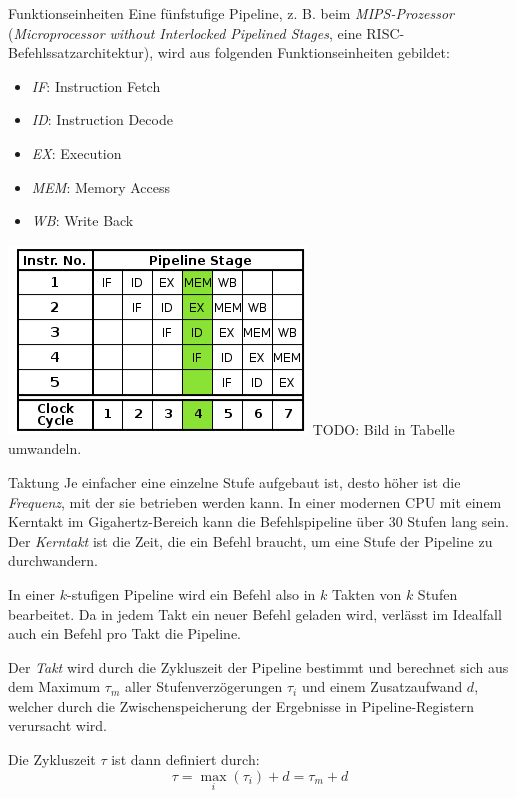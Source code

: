 \begin{defi}[Pipelining]{Funktionseinheiten}
    Eine fünfstufige Pipeline, z. B. beim \emph{MIPS-Prozessor} (\emph{Microprocessor without Interlocked Pipelined Stages}, eine RISC-Befehlssatzarchitektur), wird aus folgenden Funktionseinheiten gebildet:
    \begin{itemize}
        \item \emph{IF}: Instruction Fetch
        \item \emph{ID}: Instruction Decode
        \item \emph{EX}: Execution
        \item \emph{MEM}: Memory Access
        \item \emph{WB}: Write Back
    \end{itemize}
    
    \centering
    \includegraphics[width=0.5\linewidth]{images/5_stage_pipeline.png}
    TODO: Bild in Tabelle umwandeln.
\end{defi}

\begin{defi}[Pipelining]{Taktung}
    Je einfacher eine einzelne Stufe aufgebaut ist, desto höher ist die \emph{Frequenz}, mit der sie betrieben werden kann.
    In einer modernen CPU mit einem Kerntakt im Gigahertz-Bereich kann die Befehlspipeline über 30 Stufen lang sein.
    Der \emph{Kerntakt} ist die Zeit, die ein Befehl braucht, um eine Stufe der Pipeline zu durchwandern.
    
    In einer $k$-stufigen Pipeline wird ein Befehl also in $k$ Takten von $k$ Stufen bearbeitet.
    Da in jedem Takt ein neuer Befehl geladen wird, verlässt im Idealfall auch ein Befehl pro Takt die Pipeline.
    
    Der \emph{Takt} wird durch die Zykluszeit der Pipeline bestimmt und berechnet sich aus dem Maximum $\tau_{m}$ aller Stufenverzögerungen $\tau_{i}$ und einem Zusatzaufwand $d$, welcher durch die Zwischenspeicherung der Ergebnisse in Pipeline-Registern verursacht wird.
    
    Die Zykluszeit $\tau$ ist dann definiert durch:
    \[
        \tau = \max_i (\tau_i) + d = \tau_m + d
    \]
\end{defi}

